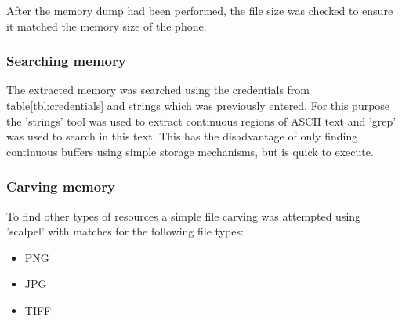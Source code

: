 After the memory dump had been performed, the file size was checked to ensure it matched the memory size of the phone.

\subsubsection{Searching memory}
The extracted memory was searched using the credentials from table\ref{tbl:credentials} and strings which was previously entered. For this purpose the 'strings' tool was used to extract continuous regions of ASCII text and 'grep' was used to search in this text. This has the disadvantage of only finding continuous buffers using simple storage mechanisms, but is quick to execute.

\subsubsection{Carving memory}
To find other types of resources a simple file carving was attempted using 'scalpel' with matches for the following file types:
\begin{itemize}
	\item PNG
	\item JPG
	\item TIFF
\end{itemize}
